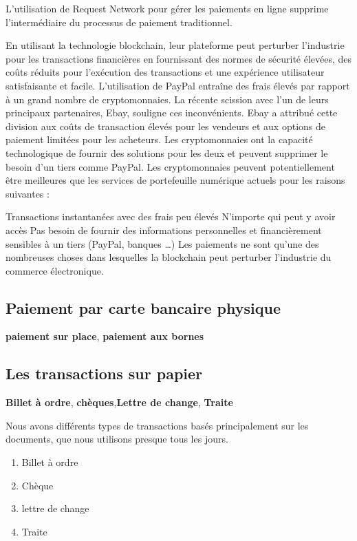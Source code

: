 \documentclass[12pt]{report}
\begin{document}
L’utilisation de Request Network pour gérer les paiements en ligne supprime l’intermédiaire du processus de paiement traditionnel.


En utilisant la technologie blockchain, leur plateforme peut perturber l’industrie pour les transactions financières en fournissant des normes de sécurité élevées, des coûts réduits pour l’exécution des transactions et une expérience utilisateur satisfaisante et facile. L’utilisation de PayPal entraîne des frais élevés par rapport à un grand nombre de cryptomonnaies. La récente scission avec l’un de leurs principaux partenaires, Ebay, souligne ces inconvénients. Ebay a attribué cette division aux coûts de transaction élevés pour les vendeurs et aux options de paiement limitées pour les acheteurs. Les cryptomonnaies ont la capacité technologique de fournir des solutions pour les deux et peuvent supprimer le besoin d’un tiers comme PayPal. Les cryptomonnaies peuvent potentiellement être meilleures que les services de portefeuille numérique actuels pour les raisons suivantes :

Transactions instantanées avec des frais peu élevés
N’importe qui peut y avoir accès
Pas besoin de fournir des informations personnelles et financièrement sensibles à un tiers (PayPal, banques …)
Les paiements ne sont qu’une des nombreuses choses dans lesquelles la blockchain peut perturber l’industrie du commerce électronique.


    \subsection{Paiement par carte bancaire physique}
\textbf{paiement sur place}, \textbf{paiement aux bornes}
\hspace{1cm}

    \subsection{Les transactions sur papier}
\textbf{Billet à ordre}, \textbf{chèques},\textbf{Lettre de change}, \textbf{Traite}

\hspace{1cm} Nous avons différents types de transactions basés principalement sur les documents,  que nous utilisons presque tous les jours. 
\begin{enumerate}
    \item Billet à ordre
    \item Chèque
    \item lettre de change
    \item Traite
\end{enumerate}
\end{document}

